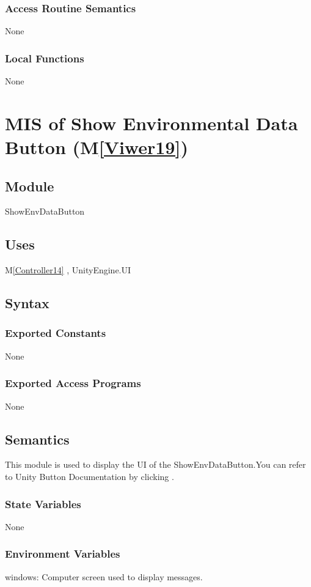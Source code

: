 \documentclass[12pt, titlepage]{article}
\newcommand{\mref}[1]{M\ref{#1}}
\begin{document}
\subsubsection{Access Routine Semantics}
None
\subsubsection{Local Functions}
None

\newpage

\section{MIS of Show Environmental Data Button (\mref{Viwer19})}

\subsection{Module}
ShowEnvDataButton

\subsection{Uses}
\mref{Controller14}  , UnityEngine.UI

\subsection{Syntax}
\subsubsection{Exported Constants}
None
\subsubsection{Exported Access Programs}
None


\subsection{Semantics}
This module is used to display the UI of the 
ShowEnvDataButton.You can refer to Unity Button Documentation by
clicking \bref.
\subsubsection{State Variables}
None
\subsubsection{Environment Variables}
windows: Computer screen used to display messages.
\end{document}
